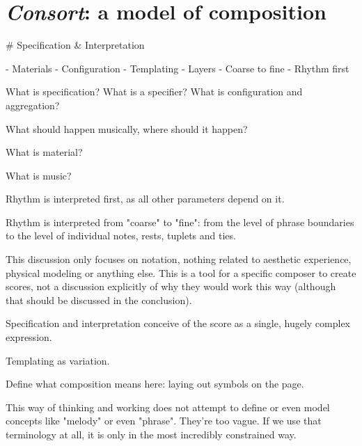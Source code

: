 \chapter{\emph{Consort}: a model of composition}
\label{chap:a-model-of-composition}

\begin{comment}
<abjad>[hide=true]
import collections
import consort
</abjad>
\end{comment}

\begin{markdown}

#   Specification & Interpretation

-   Materials
-   Configuration
-   Templating
-   Layers
-   Coarse to fine
-   Rhythm first

What is specification? What is a specifier? What is configuration and
aggregation?

What should happen musically, where should it happen?

What is material?

What is music?

Rhythm is interpreted first, as all other parameters depend on it.

Rhythm is interpreted from "coarse" to "fine": from the level of phrase
boundaries to the level of individual notes, rests, tuplets and ties.

This discussion only focuses on notation, nothing related to aesthetic
experience, physical modeling or anything else. This is a tool for a specific
composer to create scores, not a discussion explicitly of why they would work
this way (although that should be discussed in the conclusion).

Specification and interpretation conceive of the score as a single, hugely
complex expression.

Templating as variation.

Define what composition means here: laying out symbols on the page.

This way of thinking and working does not attempt to define or even model
concepts like "melody" or even "phrase". They're too vague. If we use that
terminology at all, it is only in the most incredibly constrained way.


\end{markdown}
